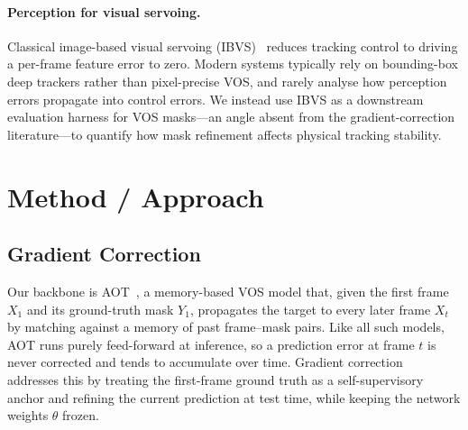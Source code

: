 \documentclass{article}
\begin{document}
\paragraph{Perception for visual servoing.}
Classical image-based visual servoing (IBVS)~\citep{chaumette2006visual} reduces tracking control to driving a per-frame feature error to zero. Modern systems typically rely on bounding-box deep trackers rather than pixel-precise VOS, and rarely analyse how perception errors propagate into control errors. We instead use IBVS as a downstream evaluation harness for VOS masks---an angle absent from the gradient-correction literature---to quantify how mask refinement affects physical tracking stability.

\section{Method / Approach}


\subsection{Gradient Correction}

Our backbone is AOT~\citep{yang2021aot}, a memory-based VOS model that, given the first frame $X_1$ and
its ground-truth mask $Y_1$, propagates the target to every later frame $X_t$ by matching against a
memory of past frame--mask pairs. Like all such models, AOT runs purely feed-forward at inference, so a
prediction error at frame $t$ is never corrected and tends to accumulate over time. Gradient
correction~\citep{li2020cycle} addresses this by treating the first-frame ground truth as a
self-supervisory anchor and refining the current prediction at test time, while keeping the network
weights $\theta$ frozen.
\end{document}
